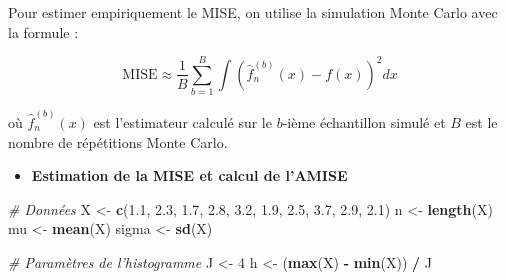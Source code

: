 \documentclass[
  12pt,
]{article}
\newenvironment{Shaded}{\begin{snugshade}}{\end{snugshade}}
\newcommand{\CommentTok}[1]{\textcolor[rgb]{0.56,0.35,0.01}{\textit{#1}}}
\newcommand{\DecValTok}[1]{\textcolor[rgb]{0.00,0.00,0.81}{#1}}
\newcommand{\FloatTok}[1]{\textcolor[rgb]{0.00,0.00,0.81}{#1}}
\newcommand{\FunctionTok}[1]{\textcolor[rgb]{0.13,0.29,0.53}{\textbf{#1}}}
\newcommand{\NormalTok}[1]{#1}
\newcommand{\OtherTok}[1]{\textcolor[rgb]{0.56,0.35,0.01}{#1}}
\newcommand{\SpecialCharTok}[1]{\textcolor[rgb]{0.81,0.36,0.00}{\textbf{#1}}}
\providecommand{\tightlist}{%
  \setlength{\itemsep}{0pt}\setlength{\parskip}{0pt}}
\begin{document}
Pour estimer empiriquement le MISE, on utilise la simulation Monte Carlo
avec la formule :

\[
\text{MISE} \approx \frac{1}{B} \sum_{b=1}^{B} \int (\hat{f}_n^{(b)}(x) - f(x))^2 dx
\]

où \(\hat{f}_n^{(b)}(x)\) est l'estimateur calculé sur le \(b\)-ième
échantillon simulé et \(B\) est le nombre de répétitions Monte Carlo.

\begin{itemize}
\tightlist
\item
  \textbf{Estimation de la MISE et calcul de l'AMISE}
\end{itemize}

\begin{Shaded}
\begin{Highlighting}[]
\CommentTok{\# Données }
\NormalTok{X }\OtherTok{\textless{}{-}} \FunctionTok{c}\NormalTok{(}\FloatTok{1.1}\NormalTok{, }\FloatTok{2.3}\NormalTok{, }\FloatTok{1.7}\NormalTok{, }\FloatTok{2.8}\NormalTok{, }\FloatTok{3.2}\NormalTok{, }\FloatTok{1.9}\NormalTok{, }\FloatTok{2.5}\NormalTok{, }\FloatTok{3.7}\NormalTok{, }\FloatTok{2.9}\NormalTok{, }\FloatTok{2.1}\NormalTok{)}
\NormalTok{n }\OtherTok{\textless{}{-}} \FunctionTok{length}\NormalTok{(X)}
\NormalTok{mu }\OtherTok{\textless{}{-}} \FunctionTok{mean}\NormalTok{(X)}
\NormalTok{sigma }\OtherTok{\textless{}{-}} \FunctionTok{sd}\NormalTok{(X)}

\CommentTok{\# Paramètres de l’histogramme}
\NormalTok{J }\OtherTok{\textless{}{-}} \DecValTok{4}
\NormalTok{h }\OtherTok{\textless{}{-}}\NormalTok{ (}\FunctionTok{max}\NormalTok{(X) }\SpecialCharTok{{-}} \FunctionTok{min}\NormalTok{(X)) }\SpecialCharTok{/}\NormalTok{ J}
\end{Highlighting}
\end{Shaded}
\end{document}
